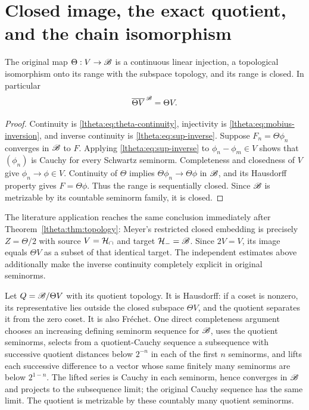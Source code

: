 \documentclass[11pt]{article}
\begin{document}
\section{Closed image, the exact quotient, and the chain isomorphism}

\begin{lthetatheorem}\label{ltheta:thm:closed}
The original map $\Theta:V\to\mathscr B$ is a continuous linear injection,
a topological isomorphism onto its range with the subspace topology,
and its range is closed. In particular
\begin{equation}\label{ltheta:eq:closed}
 \overline{\Theta V}^{\,\mathscr B}=\Theta V.
\end{equation}
\end{lthetatheorem}

\begin{proof}
Continuity is \eqref{ltheta:eq:theta-continuity}, injectivity is
\eqref{ltheta:eq:mobius-inversion}, and inverse continuity is
\eqref{ltheta:eq:sup-inverse}. Suppose $F_n=\Theta\phi_n$ converges in $\mathscr B$
to $F$. Applying \eqref{ltheta:eq:sup-inverse} to
$\phi_n-\phi_m\in V$ shows that $(\phi_n)$ is Cauchy for every
Schwartz seminorm. Completeness and closedness of $V$ give
$\phi_n\to\phi\in V$. Continuity of $\Theta$ implies
$\Theta\phi_n\to\Theta\phi$ in $\mathscr B$, and its Hausdorff property gives
$F=\Theta\phi$. Thus the range is sequentially closed. Since $\mathscr B$ is
metrizable by its countable seminorm family, it is closed.
\end{proof}

The literature application reaches the same conclusion immediately
after Theorem~\ref{ltheta:thm:topology}: Meyer's restricted closed embedding
is precisely $Z=\Theta/2$ with source $V=\mathcal H_\cap$ and target
$\mathcal H_-=\mathscr B$. Since $2V=V$, its image equals $\Theta V$ as a subset of
that identical target. The independent estimates above additionally
make the inverse continuity completely explicit in original seminorms.

Let $Q=\mathscr B/\Theta V$ with its quotient topology. It is Hausdorff:
if a coset is nonzero, its representative lies outside the closed
subspace $\Theta V$, and the quotient separates it from the zero
coset. It is also Fr\'echet. One direct completeness argument chooses
an increasing defining seminorm sequence for $\mathscr B$, uses the quotient
seminorms, selects from a quotient-Cauchy sequence a subsequence with
successive quotient distances below $2^{-n}$ in each of the first
$n$ seminorms, and lifts each successive difference to a vector whose
same finitely many seminorms are below $2^{1-n}$. The lifted series is
Cauchy in each seminorm, hence converges in $\mathscr B$ and projects to the
subsequence limit; the original Cauchy sequence has the same limit.
The quotient is metrizable by these countably many quotient seminorms.
\end{document}
